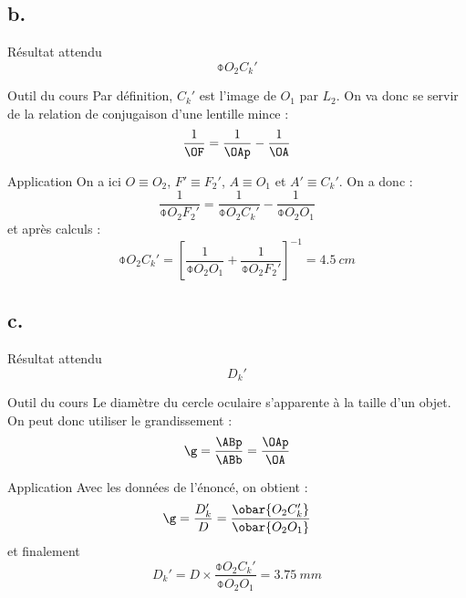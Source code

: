\documentclass[../main/main.tex]{subfiles}
\begin{document}
\setcounter{subsection}{2}
\subsection{b.}

\begin{tcbraster}[raster columns=6, raster equal height=rows]
    \begin{NCprop}[raster multicolumn=1]{Résultat attendu}
        $$\obar{O_2C_k'}$$
    \end{NCprop}
    \begin{NCdemo}[raster multicolumn=2]{Outil du cours}
        Par définition, $C_k'$ est l'image de $O_1$ par $L_2$. On va donc se servir
        de la relation de conjugaison d'une lentille mince :
        \[ \frac{1}{\OF} = \frac{1}{\OAp} - \frac{1}{\OA} \]
    \end{NCdemo}
    \begin{NCexem}[raster multicolumn=3]{Application}
        On a ici $O \equiv O_2$, $F' \equiv F_2'$, $A \equiv O_1$ et $A' \equiv
        C_k'$. On a donc :
        \[ \frac{1}{\obar{O_2F_2'}} = \frac{1}{\obar{O_2C_k'}} -
        \frac{1}{\obar{O_2O_1}} \]
        et après calculs :
        \[ \boxed{\obar{O_2C_k'} = \left[ \frac{1}{\obar{O_2O_1}} +
        \frac{1}{\obar{O_2F_2'}}\right]^{-1} = \SI{+4.5}{cm}} \]
    \end{NCexem}
\end{tcbraster}

\setcounter{subsection}{2}
\subsection{c.}
\begin{tcbraster}[raster columns=5, raster equal height=rows]
    \begin{NCprop}[raster multicolumn=1]{Résultat attendu}
        $$D_k'$$
    \end{NCprop}
    \begin{NCdemo}[raster multicolumn=2]{Outil du cours}
        Le diamètre du cercle oculaire s'apparente à la taille d'un objet. On peut
        donc utiliser le grandissement :
        \[ \g = \frac{\ABp}{\ABb} = \frac{\OAp}{\OA} \]
    \end{NCdemo}
    \begin{NCexem}[raster multicolumn=2]{Application}
        Avec les données de l'énoncé, on obtient :
        \[ \g = \frac{D_k'}{D} = \frac{\obar{O_2C_k'}}{\obar{O_2O_1}}\]
        et finalement
        \[ \boxed{D_k' = D\times \frac{\obar{O_2C_k'}}{\obar{O_2O_1}} =
        \SI{3.75}{mm}} \]
    \end{NCexem}
    
\end{tcbraster}
\end{document}
